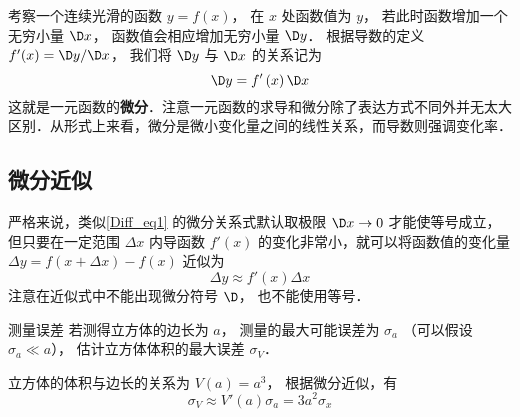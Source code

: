 

考察一个连续光滑的函数 $y = f\left( x \right)$， 在 ${x}$ 处函数值为 ${y}$， 若此时函数增加一个无穷小量 $\D x$， 函数值会相应增加无穷小量 $\D y$． 根据导数的定义 $f'({{x}}) = \D y/\D x$， 我们将 $\D y$ 与 $\D x$ 的关系记为
\begin{equation}\label{Diff_eq1}
\D y = f'\left( {{x}} \right)\D x
\end{equation}
这就是一元函数的\textbf{微分}．注意一元函数的求导和微分除了表达方式不同外并无太大区别．从形式上来看，微分是微小变化量之间的线性关系，而导数则强调变化率．

\subsection{微分近似}
严格来说，类似\autoref{Diff_eq1} 的微分关系式默认取极限 $\D x \to 0$ 才能使等号成立，但只要在一定范围 $\Delta x$ 内导函数 $f'(x)$ 的变化非常小，就可以将函数值的变化量 $\Delta y = f(x+\Delta x)-f(x)$ 近似为
\begin{equation}
\Delta y \approx f'(x) \Delta x
\end{equation}
注意在近似式中不能出现微分符号 $\D$， 也不能使用等号．

\begin{exam}{测量误差}\label{Diff_ex1}
若测得立方体的边长为 $a$， 测量的最大可能误差为 $\sigma_a$ （可以假设 $\sigma_a \ll a$）， 估计立方体体积的最大误差 $\sigma_V$．

立方体的体积与边长的关系为 $V(a)=a^3$， 根据微分近似，有
\begin{equation}
\sigma_V \approx V'(a) \sigma_a = 3a^2 \sigma_x
\end{equation}
\end{exam}




